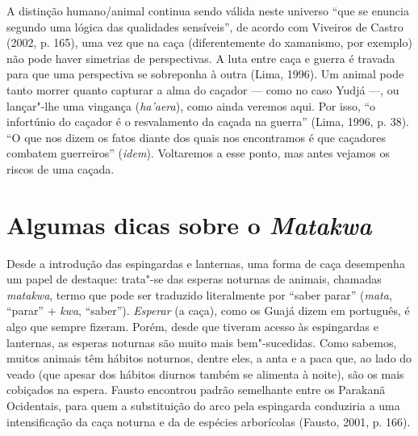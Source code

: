 A distinção humano/animal continua sendo válida neste universo ``que se
enuncia segundo uma lógica das qualidades sensíveis'', de acordo com
Viveiros de Castro (2002, p. 165), uma vez que na caça (diferentemente
do xamanismo, por exemplo) não pode haver simetrias de perspectivas. A
luta entre caça e guerra é travada para que uma perspectiva se
sobreponha à outra (Lima, 1996). Um animal pode tanto morrer quanto
capturar a alma do caçador --- como no caso Yudjá ---, ou lançar"-lhe uma
vingança (\emph{ha'aera}), como ainda veremos aqui. Por isso, ``o
infortúnio do caçador é o resvalamento da caçada na guerra'' (Lima, 1996,
p. 38). ``O que nos dizem os fatos diante dos quais nos encontramos é que
caçadores combatem guerreiros'' (\emph{idem}). Voltaremos a esse ponto, mas
antes vejamos os riscos de uma caçada.

\section{Algumas dicas sobre o \emph{Matakwa}}

Desde a introdução das espingardas e lanternas, uma forma de caça
desempenha um papel de destaque: trata"-se das esperas noturnas de
animais, chamadas \emph{matakwa}, termo que pode ser traduzido
literalmente por ``saber parar'' (\emph{mata}, ``parar'' + \emph{kwa},
``saber''). \emph{Esperar} (a caça), como os Guajá dizem em português, é
algo que sempre fizeram. Porém, desde que tiveram acesso às espingardas
e lanternas, as esperas noturnas são muito mais bem"-sucedidas. Como
sabemos, muitos animais têm hábitos noturnos, dentre eles, a anta e a
paca que, ao lado do veado (que apesar dos hábitos diurnos também se
alimenta à noite), são os mais cobiçados na espera. Fausto encontrou
padrão semelhante entre os Parakanã Ocidentais, para quem a substituição
do arco pela espingarda conduziria a uma intensificação da caça noturna
e da de espécies arborícolas (Fausto, 2001, p. 166).

